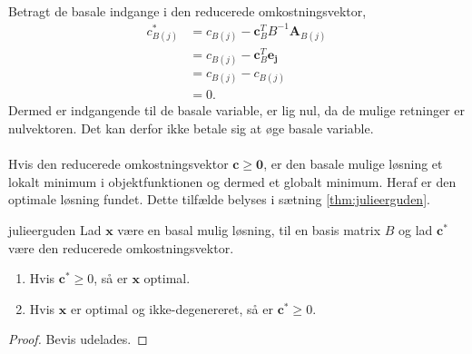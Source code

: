 {\begin{align*}
\end{align*}
%
Betragt de basale indgange i den reducerede omkostningsvektor,
%
\begin{align*}
c^*_{B(j)} & = c_{B(j)} - \mathbf{c}_B^T B^{-1} \mathbf{A}_{B(j)} \\
& = c_{B(j)} - \mathbf{c}_B^T \mathbf{e_j} \\
& = c_{B(j)} -  c_{B(j)}  \\
& = 0.
\end{align*}
%
Dermed er indgangende til de basale variable, er lig nul, da de mulige retninger er nulvektoren. 
Det kan derfor ikke betale sig at øge basale variable.
\\\\
Hvis den reducerede omkostningsvektor $\mathbf{c} \geq \mathbf{0}$, er den basale mulige løsning et lokalt minimum i objektfunktionen og dermed et globalt minimum. Heraf er den optimale løsning fundet. Dette tilfælde belyses i sætning \ref{thm:julieerguden}.
%
\begin{thm}{}{julieerguden}
Lad $\mathbf{x}$ være en basal mulig løsning, til en basis matrix $B$ og lad $\mathbf{c}^*$ være den reducerede omkostningsvektor. 
\begin{enumerate}[label = (\alph*)]
\item Hvis $\mathbf{c}^* \geq 0$, så er $\mathbf{x}$ optimal.
\item Hvis $\mathbf{x}$ er optimal og ikke-degenereret, så er $\mathbf{c}^* \geq 0$.
\end{enumerate}
\end{thm}
%
\begin{proof}
Bevis udelades.

\end{proof}}
